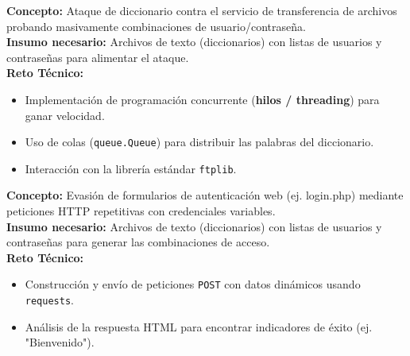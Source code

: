 \documentclass[12pt,a4paper]{article}
\begin{document}
\begin{tcolorbox}[colframe=group3, colback=group3!5, title=\textbf{Grupo 3: Fuerza Bruta FTP (\texttt{bruteforce\_ftp.py})}, arc=2mm, fonttitle=\bfseries]
\textbf{Concepto:} Ataque de diccionario contra el servicio de transferencia de archivos probando masivamente combinaciones de usuario/contraseña.\\
\textbf{Insumo necesario:} Archivos de texto (diccionarios) con listas de usuarios y contraseñas para alimentar el ataque.\\
\textbf{Reto Técnico:}
\begin{itemize}
    \item Implementación de programación concurrente (\textbf{hilos / threading}) para ganar velocidad.
    \item Uso de colas (\texttt{queue.Queue}) para distribuir las palabras del diccionario.
    \item Interacción con la librería estándar \texttt{ftplib}.
\end{itemize}
\end{tcolorbox}

\begin{tcolorbox}[colframe=group4, colback=group4!5, title=\textbf{Grupo 4: Fuerza Bruta Web (\texttt{bruteforce\_web.py})}, arc=2mm, fonttitle=\bfseries]
\textbf{Concepto:} Evasión de formularios de autenticación web (ej. login.php) mediante peticiones HTTP repetitivas con credenciales variables.\\
\textbf{Insumo necesario:} Archivos de texto (diccionarios) con listas de usuarios y contraseñas para generar las combinaciones de acceso.\\
\textbf{Reto Técnico:}
\begin{itemize}
    \item Construcción y envío de peticiones \texttt{POST} con datos dinámicos usando \texttt{requests}.
    \item Análisis de la respuesta HTML para encontrar indicadores de éxito (ej. "Bienvenido").
\end{itemize}
\end{tcolorbox}
\end{document}
